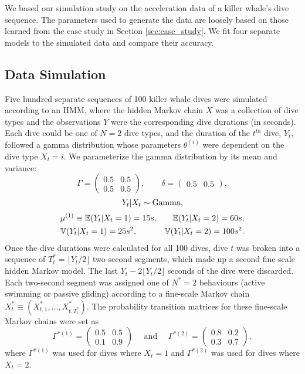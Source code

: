 

We based our simulation study on the acceleration data of a killer whale's dive sequence. The parameters used to generate the data are loosely based on those learned from the case study in Section \ref{sec:case_study}. We fit four separate models to the simulated data and compare their accuracy.

\subsection{Data Simulation}

Five hundred separate sequences of 100 killer whale dives were simulated according to an HMM, where the hidden Markov chain $X$ was a collection of dive types and the observations $Y$ were the corresponding dive durations (in seconds). Each dive could be one of $N=2$ dive types, and the duration of the $t^{th}$ dive, $Y_t$, followed a gamma distribution whose parameters $\theta^{(i)}$ were dependent on the dive type $X_t = i$. We parameterize the gamma distribution by its mean and variance:
%
$$\Gamma = \begin{pmatrix} 0.5 & 0.5 \\ 0.5 & 0.5 \end{pmatrix}, \qquad \delta =  \begin{pmatrix} 0.5 & 0.5 \end{pmatrix},$$
$$Y_t|X_t \sim \rm{Gamma},$$
\begin{align*}
	&\mu^{(1)} \equiv \mathbb{E}(Y_t|X_t = 1) = 15 s, &\mathbb{E}(Y_t|X_t = 2) = 60 s, \\
	&\mathbb{V}(Y_t|X_t = 1) = 25 s^2, &\mathbb{V}(Y_t|X_t = 2) = 100 s^2.
\end{align*}
%
Once the dive durations were calculated for all 100 dives, dive $t$ was broken into a sequence of $T^*_t = \lfloor Y_t/2 \rfloor$ two-second segments, which made up a second fine-scale hidden Markov model. The last $Y_t - 2\lfloor Y_t/2 \rfloor$ seconds of the dive were discarded. Each two-second segment was assigned one of $N^*=2$ behaviours (active swimming or passive gliding) according to a fine-scale Markov chain $X^*_t \equiv \left(X^*_{t,1}, \ldots, X^*_{t,T^*_t} \right)$. The probability transition matrices for these fine-scale Markov chains were set as
%
$$\Gamma^{*(1)} = \begin{pmatrix} 0.5 & 0.5 \\ 0.1 & 0.9 \end{pmatrix} \quad \text{ and } \quad \Gamma^{*(2)} = \begin{pmatrix} 0.8 & 0.2 \\ 0.3 & 0.7 \end{pmatrix},$$ 
%
where $\Gamma^{*(1)}$ was used for dives where $X_t = 1$ and $\Gamma^{*(2)}$ was used for dives where $X_t = 2$. 

